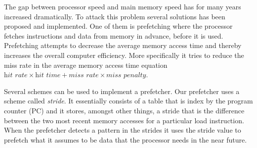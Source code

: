 The gap between processor speed and main memory speed has for many years increased
dramatically\cite{IEEEexample:biblatex}. To
attack this problem several solutions has been proposed and implemented. One of them is prefetching
where the processor fetches instructions and data from memory in advance, before it is used.
Prefetching attempts to decrease the average memory access time and thereby increases the overall
computer efficiency. More specifically it tries to reduce the miss rate in the average memory access
time equation $ \textit{hit rate} \times \textit{hit time} + \textit{miss rate} \times \textit{miss penalty} $.

Several schemes can be used to implement a prefetcher. Our prefetcher uses a scheme called
\emph{stride}. It essentially consists of a table that is index by the program counter (PC) and it
stores, amongst other things, a stride that is the difference between the two most recent memory
accesses for a particular load instruction. When the prefetcher detects a pattern in the strides it
uses the stride value to prefetch what it assumes to be data that the processor needs in the near
future.


